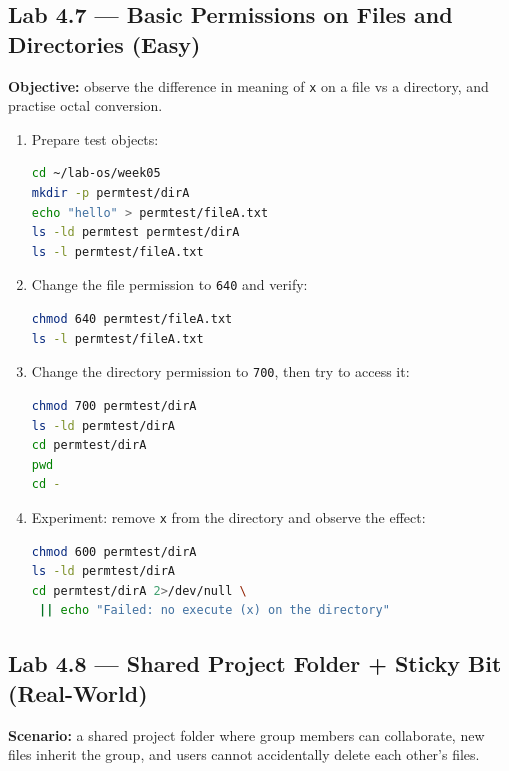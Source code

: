 \subsection*{Lab 4.7 --- Basic Permissions on Files and Directories (Easy)}
\textbf{Objective:} observe the difference in meaning of \texttt{x} on a file
vs a directory, and practise octal conversion.

\begin{enumerate}
    \item Prepare test objects:
\begin{lstlisting}[language=bash, caption={Setting up permission test objects}]
cd ~/lab-os/week05
mkdir -p permtest/dirA
echo "hello" > permtest/fileA.txt
ls -ld permtest permtest/dirA
ls -l permtest/fileA.txt
\end{lstlisting}

    \item Change the file permission to \texttt{640} and verify:
\begin{lstlisting}[language=bash, caption={chmod on a file using octal}]
chmod 640 permtest/fileA.txt
ls -l permtest/fileA.txt
\end{lstlisting}

    \item Change the directory permission to \texttt{700}, then try to access it:
\begin{lstlisting}[language=bash, caption={chmod on a directory and testing access}]
chmod 700 permtest/dirA
ls -ld permtest/dirA
cd permtest/dirA
pwd
cd -
\end{lstlisting}

    \item Experiment: remove \texttt{x} from the directory and observe the effect:
\begin{lstlisting}[language=bash, caption={Testing the effect of removing x from a directory}]
chmod 600 permtest/dirA
ls -ld permtest/dirA
cd permtest/dirA 2>/dev/null \
 || echo "Failed: no execute (x) on the directory"
\end{lstlisting}
\end{enumerate}

\subsection*{Lab 4.8 --- Shared Project Folder + Sticky Bit (Real-World)}
\textbf{Scenario:} a shared project folder where group members can collaborate,
new files inherit the group, and users cannot accidentally delete each other's
files.

